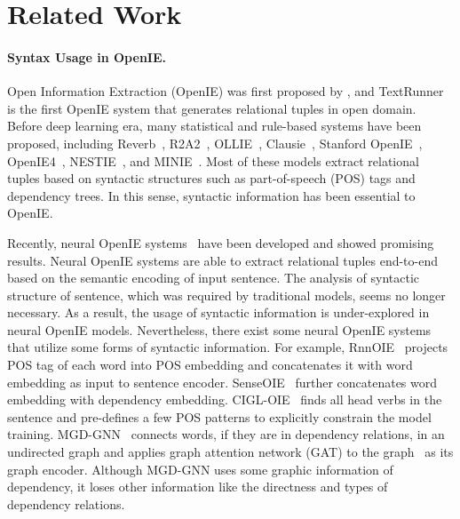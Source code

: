 \documentclass[11pt]{article}
\begin{document}
\section{Related Work}


\paragraph{Syntax Usage in OpenIE.}
Open Information Extraction (OpenIE) was first proposed by \citet{yates2007textrunner}, and TextRunner is the first OpenIE system that generates relational tuples in open domain. 
Before deep learning era, many statistical and rule-based systems have been proposed, including Reverb~\cite{fader2011identifying}, R2A2~\cite{fader2011identifying}, OLLIE~\cite{schmitz2012open}, Clausie~\cite{del2013clausie}, Stanford OpenIE~\cite{angeli2015leveraging}, OpenIE4~\cite{mausam2016open}, NESTIE~\cite{bhutani2016nested}, and MINIE~\cite{gashteovski2017minie}. 
Most of these models extract relational tuples based on syntactic structures such as part-of-speech (POS) tags and dependency trees.
In this sense, syntactic information has been essential to OpenIE. 


Recently, neural OpenIE systems~\cite{cui2018neural, stanovsky2018supervised, roy2019supervising, kolluru2020imojie, dong2021docoie, vasilkovsky2022detie, kotnis-etal-2022-milie} have been developed and showed promising results. 
Neural OpenIE systems are able to extract relational tuples end-to-end based on the semantic encoding of input sentence.
The analysis of syntactic structure of sentence, which was required by traditional models, seems no longer necessary.
As a result, the usage of syntactic information is under-explored in neural OpenIE models. 
Nevertheless, there exist some neural OpenIE systems that utilize some forms of syntactic information.
For example, RnnOIE~\cite{stanovsky2018supervised} projects POS tag of each word into POS embedding and concatenates it with word embedding as input to sentence encoder. 
SenseOIE~\cite{roy2019supervising} further concatenates word embedding with dependency embedding.
CIGL-OIE~\cite{kolluru2020openie6} finds all head verbs in the sentence and pre-defines a few POS patterns to explicitly constrain the model training. 
MGD-GNN~\cite{MGD-GNN_2021} connects words, if they are in dependency relations, in an undirected graph and applies graph attention network (GAT) to the graph~\cite{velivckovic2017graph} as its graph encoder. Although MGD-GNN uses some graphic information of dependency, it loses other information like the directness and types of dependency relations.
\end{document}
